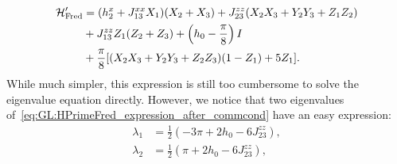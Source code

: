 \begin{equation}
\begin{aligned}
    {\mathcal{H}}'_{\operatorname{Fred}} &=
    (h_2^x + J_{13}^{xx} X_1)(X_2+X_3)
    + J_{23}^{zz} (X_2 X_3 + Y_2 Y_3 + Z_1 Z_2) \\
    &+ J_{13}^{zz} Z_1 (Z_2 + Z_3)
    + \left(h_0 - \frac{\pi}{8}\right) I \\
    &+ \frac{\pi}{8} [
        (X_2 X_3 + Y_2 Y_3 + Z_2 Z_3) (1 - Z_1)
        + 5 Z_1
    ].
\end{aligned}
\label{eq:GL:HPrimeFred_expression_after_commcond}
\end{equation}
While much simpler, this expression is still too cumbersome to solve the eigenvalue equation directly.
However, we notice that two eigenvalues of~\cref{eq:GL:HPrimeFred_expression_after_commcond} have an easy expression:
\begin{equation}
\begin{aligned}
    \lambda_1 &= \frac{1}{2}( -3\pi + 2h_0 - 6J_{23}^{zz}), \\
    \lambda_2 &= \frac{1}{2}( \pi   + 2h_0 - 6J_{23}^{zz}),
\end{aligned}
\label{eq:GL:fredkin_first_two_nice_eigenvalues}
\end{equation}

